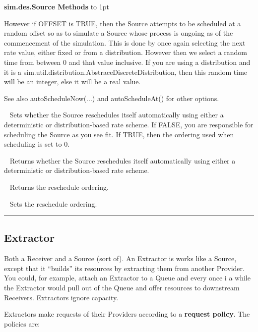 \documentclass[twoside,10pt]{article}
\newcommand\class[1]{\index{Classes!{#1}}\textsf{#1}}
\newcommand*{\xfill}[1][0pt]{%
	\cleaders
		\hbox to 1pt{\hss
			\raisebox{#1}{\rule{1.2pt}{0.4pt}}%
			\hss}\hfill}
\newenvironment{methods}[1]{
\vspace{1.0em}\noindent\textsf{\textbf{#1 Methods}}\quad \xfill[0.5ex]
\vspace{-0.25em}
\begin{description}
\small}
{\end{description}\hrule\vspace{1.5em}}
\newcommand{\mthd}[1]{\item[{\sf #1}]~\newline}
\begin{document}
\begin{methods}{\class{sim.des.Source}}
    	However if OFFSET is TRUE, then the Source attempts to be scheduled at a random offset so as to simulate
    	a Source whose process is ongoing as of the commencement of the simulation.  This is done by once again
    	selecting the next rate value, either fixed or from a distribution.  However then we select a random
    	time from between 0 and that value inclusive.  If you are using a distribution and it is a
    	sim.util.distribution.AbstraceDiscreteDistribution, then this random time will be an integer, else it
    	will be a real value.
    	
    	See also autoScheduleNow(...) and autoScheduleAt() for other options.
	
\mthd{public void setAutoSchedules(boolean val)}
Sets whether the Source reschedules itself automatically using either a deterministic or distribution-based
        rate scheme.  If FALSE, you are responsible for scheduling the Source as you see fit. If TRUE,
        then the ordering used when scheduling is set to 0.
        
\mthd{public boolean getAutoSchedules()}
Returns whether the Source reschedules itself automatically using either a deterministic or distribution-based
        rate scheme.
        
\mthd{public int getRescheduleOrdering()}
Returns the reschedule ordering. 

\mthd{public void setRescheduleOrdering(int ordering)}
Sets the reschedule ordering. 

\end{methods}

\subsection{Extractor}

Both a Receiver and a Source (sort of).  An Extractor is works like a Source, except that it ``builds'' its resources by extracting them from another Provider.  You could, for example, attach an Extractor to a Queue and every once i a while the Extractor would pull out of the Queue and offer resources to downstream Receivers.  Extractors ignore capacity.

Extractors make requests of their Providers according to a {\bf request policy}.  The policies are:
\end{document}
